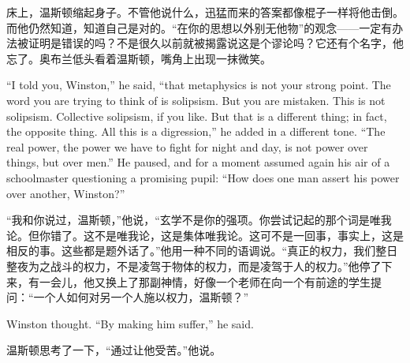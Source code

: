 \begin{paracol}{2}
\switchcolumn

床上，温斯顿缩起身子。不管他说什么，迅猛而来的答案都像棍子一样将他击倒。而他仍然知道，知道自己是对的。``在你的思想以外别无他物''的观念——一定有办法被证明是错误的吗？不是很久以前就被揭露说这是个谬论吗？它还有个名字，他忘了。奥布兰低头看着温斯顿，嘴角上出现一抹微笑。

\switchcolumn*

``I told you, Winston,'' he said, ``that metaphysics is not your strong
point. The word you are trying to think of is solipsism. But you are
mistaken. This is not solipsism. Collective solipsism, if you like. But
that is a different thing; in fact, the opposite thing. All this is a
digression,'' he added in a different tone. ``The real power, the power we
have to fight for night and day, is not power over things, but over
men.'' He paused, and for a moment assumed again his air of a
schoolmaster questioning a promising pupil: ``How does one man assert his
power over another, Winston?''

\switchcolumn

``我和你说过，温斯顿，''他说，``玄学不是你的强项。你尝试记起的那个词是唯我论。但你错了。这不是唯我论，这是集体唯我论。这可不是一回事，事实上，这是相反的事。这些都是题外话了。''他用一种不同的语调说。``真正的权力，我们整日整夜为之战斗的权力，不是凌驾于物体的权力，而是凌驾于人的权力。''他停了下来，有一会儿，他又换上了那副神情，好像一个老师在向一个有前途的学生提问：``一个人如何对另一个人施以权力，温斯顿？''

\switchcolumn*

Winston thought. ``By making him suffer,'' he said.

\switchcolumn

温斯顿思考了一下，``通过让他受苦。''他说。

\switchcolumn*


\end{paracol}
